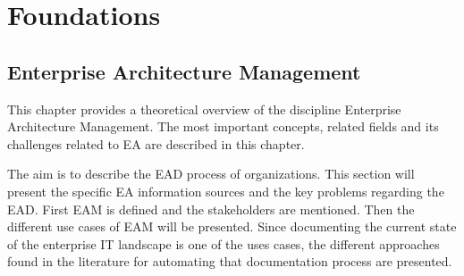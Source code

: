 
\chapter{Foundations}\label{chapter:foundations}
\section{Enterprise Architecture Management} 

This chapter provides a theoretical overview of the discipline Enterprise Architecture Management. The most important concepts, related fields and its challenges related to EA are described in this chapter.

The aim is to describe the EAD process of organizations. This section will present the specific EA information sources and the key problems regarding the EAD. First EAM is defined and the stakeholders are mentioned. Then the different use cases of EAM will be presented. Since documenting the current state of the enterprise IT landscape is one of the uses cases, the different approaches found in the literature for automating that documentation process are presented.



